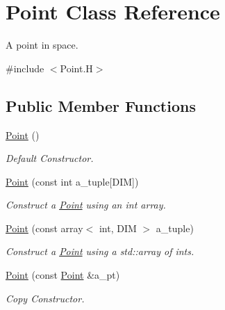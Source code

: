 \hypertarget{class_point}{}\section{Point Class Reference}
\label{class_point}


A point in space.  




{\ttfamily \#include $<$Point.\+H$>$}

\subsection*{Public Member Functions}
\begin{DoxyCompactItemize}
\item 
\mbox{\label{class_point_ad92f2337b839a94ce97dcdb439b4325a}} 
\hyperlink{class_point_ad92f2337b839a94ce97dcdb439b4325a}{Point} ()
\begin{DoxyCompactList}\small\item\em Default Constructor. \end{DoxyCompactList}\item 
\mbox{\label{class_point_ad2979175ac77062182ecfae283c8b97f}} 
\hyperlink{class_point_ad2979175ac77062182ecfae283c8b97f}{Point} (const int a\+\_\+tuple\mbox{[}D\+IM\mbox{]})
\begin{DoxyCompactList}\small\item\em Construct a \hyperlink{class_point}{Point} using an int array. \end{DoxyCompactList}\item 
\mbox{\label{class_point_abaef269e1437aab4ed03ba64b4fafaa2}} 
\hyperlink{class_point_abaef269e1437aab4ed03ba64b4fafaa2}{Point} (const array$<$ int, D\+IM $>$ a\+\_\+tuple)
\begin{DoxyCompactList}\small\item\em Construct a \hyperlink{class_point}{Point} using a std\+::array of ints. \end{DoxyCompactList}\item 
\mbox{\label{class_point_ad3049b9597a2dc93be3fc304bbf3cdbb}} 
\hyperlink{class_point_ad3049b9597a2dc93be3fc304bbf3cdbb}{Point} (const \hyperlink{class_point}{Point} \&a\+\_\+pt)
\begin{DoxyCompactList}\small\item\em Copy Constructor. \end{DoxyCompactList}\item 

\end{DoxyCompactItemize}
